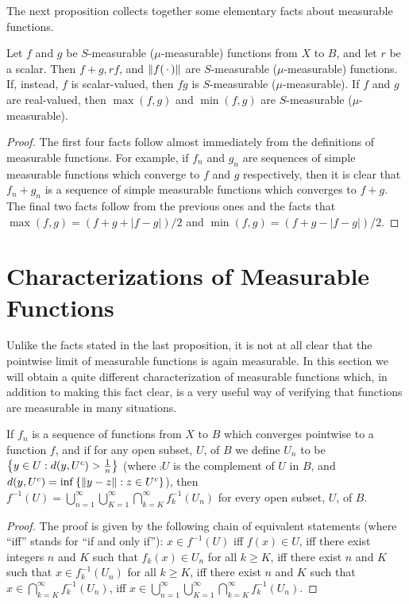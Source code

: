 The next proposition collects together some elementary facts about measurable functions.

\begin{proposition}\label{prop:sum product of meas function}
Let $f$ and $g$ be $S$-measurable ($\mu$-measurable) functions from $X$ to $B$, and let $r$ be a scalar. Then $f+g, rf$, and $\norm{f(\,\cdot\,)}$ are $S$-measurable ($\mu$-measurable) functions. If, instead, $f$ is scalar-valued, then $fg$ is $S$-measurable ($\mu$-measurable). If $f$ and $g$ are real-valued, then $\max(f, g)$ and $\min(f, g)$ are $S$-measurable ($\mu$-measurable).
\end{proposition}

\begin{proof}
The first four facts follow almost immediately from the definitions of measurable functions. For example, if $f_n$ and $g_n$ are sequences of simple measurable functions which converge to $f$ and $g$ respectively, then it is clear that $f_n+g_n$ is a sequence of simple measurable functions which converges to $f+g$. The final two facts follow from the previous ones and the facts that $\max(f, g)=(f+g+|f-g|)/2$ and $\min(f, g)=(f+g-|f-g|)/2$.
\end{proof}

\section{Characterizations of Measurable Functions}

Unlike the facts stated in the last proposition, it is not at all clear that the pointwise limit of measurable functions is again measurable. In this section we will obtain a quite different characterization of measurable functions which, in addition to making this fact clear, is a very useful way of verifying that functions are measurable in many situations.

\begin{lemma}\label{lem:preimage of open set as sigma union intersection}
If $f_n$ is a sequence of functions from $X$ to $B$ which converges pointwise to a function $f$, and if for any open subset, $U$, of $B$ we define $U_n$ to be $\left\{y\in U:d(y,{U}^c)>\frac1n\right\}$ (where $\comp{U}$ is the complement of $U$ in $B$, and $d(y,{U}^c)=\inf\left\{\norm{y-z}:z\in{U}^c\right\}$), then $f^{-1}(U)=\bigcup_{n=1}^\infty\bigcup_{K=1}^\infty\bigcap_{k=K}^\infty f_k^{-1}(U_n)$ for every open subset, $U$, of $B$.
\end{lemma}

\begin{proof}
The proof is given by the following chain of equivalent statements (where ``iff'' stands for ``if and only if''): $x\in f^{-1}(U)$ iff $f(x)\in U$, iff there exist integers $n$ and $K$ such that $f_k(x)\in U_n$ for all $k\geq K$, iff there exist $n$ and $K$ such that $x\in f_k^{-1}(U_n)$ for all $k\geq K$, iff there exist $n$ and $K$ such that $x\in\bigcap_{k=K}^\infty f_k^{-1}(U_n)$, iff $x\in\bigcup_{n=1}^\infty\bigcup_{K=1}^\infty\bigcap_{k=K}^\infty f_k^{-1}(U_n)$.
\end{proof}

